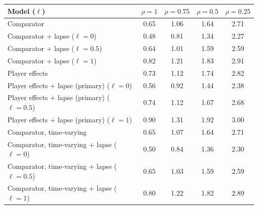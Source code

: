 \begin{tabular}{lcccc}
\toprule
Model ($\ell$) & $\rho=1$ & $\rho=0.75$ & $\rho=0.5$ & $\rho=0.25$ \\
\midrule
Comparator & 0.65 & 1.06 & 1.64 & 2.71 \\
Comparator + lapse ($\ell=0$) & 0.48 & 0.81 & 1.34 & 2.27 \\
Comparator + lapse ($\ell=0.5$) & 0.64 & 1.01 & 1.59 & 2.59 \\
Comparator + lapse ($\ell=1$) & 0.82 & 1.21 & 1.83 & 2.91 \\
Player effects & 0.73 & 1.12 & 1.74 & 2.82 \\
Player effects + lapse (primary) ($\ell=0$) & 0.56 & 0.92 & 1.44 & 2.38 \\
Player effects + lapse (primary) ($\ell=0.5$) & 0.74 & 1.12 & 1.67 & 2.68 \\
Player effects + lapse (primary) ($\ell=1$) & 0.90 & 1.31 & 1.92 & 3.00 \\
Comparator, time-varying & 0.65 & 1.07 & 1.64 & 2.71 \\
Comparator, time-varying + lapse ($\ell=0$) & 0.50 & 0.84 & 1.36 & 2.30 \\
Comparator, time-varying + lapse ($\ell=0.5$) & 0.65 & 1.03 & 1.59 & 2.59 \\
Comparator, time-varying + lapse ($\ell=1$) & 0.80 & 1.22 & 1.82 & 2.89 \\
\bottomrule
\end{tabular}

